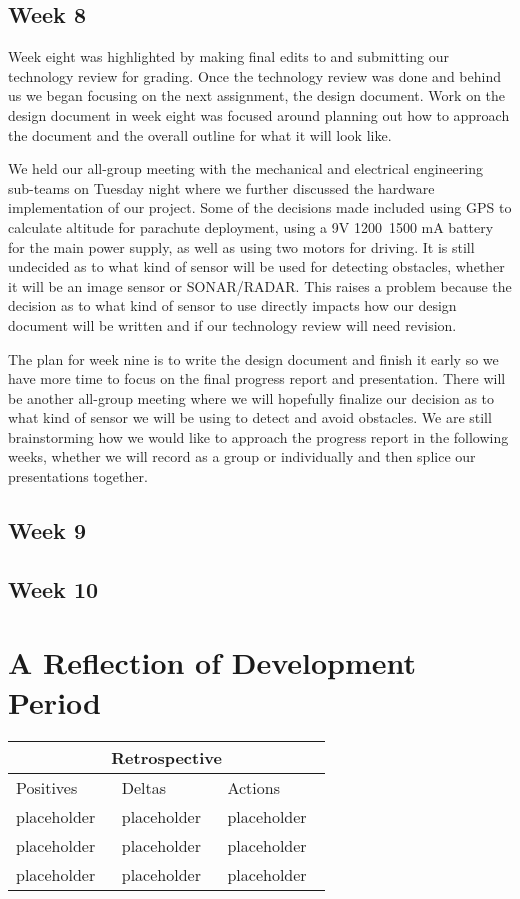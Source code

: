 \documentclass[10pt,letterpaper,onecolumn,draftclsnofoot,journal]{IEEEtran}
\begin{document}
\subsection{Week 8}
\par
Week eight was highlighted by making final edits to and submitting our technology review for grading. Once the technology review was done and behind us we began focusing on the next assignment, the design document. Work on the design document in week eight was focused around planning out how to approach the document and the overall outline for what it will look like.
\par
We held our all-group meeting with the mechanical and electrical engineering sub-teams on Tuesday night where we further discussed the hardware implementation of our project. Some of the decisions made included using GPS to calculate altitude for parachute deployment, using a 9V 1200~1500 mA battery for the main power supply, as well as using two motors for driving. It is still undecided as to what kind of sensor will be used for detecting obstacles, whether it will be an image sensor or SONAR/RADAR. This raises a problem because the decision as to what kind of sensor to use directly impacts how our design document will be written and if our technology review will need revision.
\par
The plan for week nine is to write the design document and finish it early so we have more time to focus on the final progress report and presentation. There will be another all-group meeting where we will hopefully finalize our decision as to what kind of sensor we will be using to detect and avoid obstacles. We are still brainstorming how we would like to approach the progress report in the following weeks, whether we will record as a group or individually and then splice our presentations together.


\subsection{Week 9}


\subsection{Week 10}



\section{A Reflection of Development Period}
\begin{tabular}{ |p{0.3\linewidth}|p{0.3\linewidth}|p{0.3\linewidth}|  }
\hline
\multicolumn{3}{|c|}{Retrospective} \\
\hline
Positives& Deltas &Actions \\
\hline
placeholder & placeholder &placeholder \\
placeholder & placeholder &placeholder \\
placeholder & placeholder &placeholder \\
\hline
\end{tabular}
\end{document}
